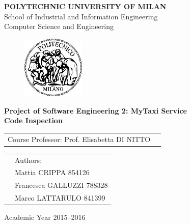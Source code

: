 \documentclass[a4paper, 12pt]{report}
\begin{document}
\begin{titlepage}

\begin{center}
\Large
\textbf{POLYTECHNIC UNIVERSITY OF MILAN} \\
\Large
School of Industrial and Information Engineering \\
Computer Science and Engineering
\end{center}

\addvspace{0.8cm}
\begin{figure}[h]
\begin{center}
\includegraphics[width=3cm]{cpt/img/polimi}
\end{center}
\end{figure}

\addvspace{0.1cm}
\begin{center}
\LARGE

\textbf{Project of Software Engineering 2: MyTaxi Service \\
Code Inspection}

\end{center}

\addvspace{0.5cm}
\Large
\begin{center}
\begin{tabular}{p{}p{}}
Course Professor: Prof. Elisabetta DI NITTO \\
\end{tabular}
\end{center}

\addvspace{0.6cm}
\Large
\begin{center}
\begin{tabular}{p{}p{}}
& Authors: \\
& Mattia 	CRIPPA		854126\\
& Francesca GALLUZZI	788328\\
& Marco 	LATTARULO	841399
\end{tabular}
\end{center}

\vfill
\Large
\begin{center}
Academic Year 2015--2016
\end{center}
\end{titlepage}

\clearpage

\tableofcontents
\clearpage

\listoffigures
\clearpage


\clearpage


\clearpage


\clearpage
\end{document}
